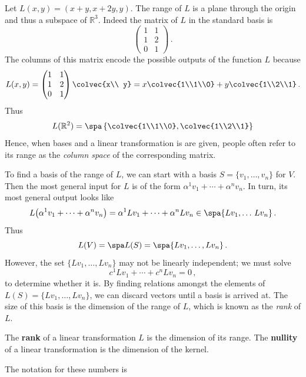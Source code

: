 \begin{example}
Let $L(x,y)=(x+y,x+2y,y)$. The range of $L$ is a plane through the origin and thus a subspace of ${\mathbb R}^3$.
Indeed the matrix of $L$ in the standard basis is 
\[
\begin{pmatrix}1&1\\1&2\\0&1\end{pmatrix}\, .
\]
The columns of this matrix encode the possible outputs of the function $L$ because
\[
L(x,y)=\begin{pmatrix}1&1\\1&2\\0&1\end{pmatrix}\colvec{x\\ y}=x \colvec{1\\1\\0}+y\colvec{1\\2\\1}\, . 
\]
Thus 
\[
L({\mathbb R}^2)=\spa \left\{\colvec{1\\1\\0},\colvec{1\\2\\1}\right\}
\]
Hence, when  bases and a linear transformation is are given, people often refer to its range as the {\itshape column space}
of the corresponding matrix.
\end{example}

To find a basis of the range of $L$, we can start with a basis $S=\{v_1, \ldots, v_n\} $ for $V$. Then
the most general input for $L$ is of the form  $\alpha^1 v_1 + \cdots + \alpha^n v_n$. In turn, its most general output looks like
\[
L\big(\alpha^1 v_1 + \cdots + \alpha^n v_n\big)=\alpha^1 Lv_1 + \cdots + \alpha^n Lv_n\in \spa\{Lv_1,\ldots\,Lv_n\}\, .
\]
Thus
\[
L(V)=\spa L(S) = \spa \{Lv_1, \ldots, Lv_n\}\, .
\]
However, the set $\{Lv_1, \ldots, Lv_n\}$ may not be linearly independent; we must solve 
\[
c^1Lv_1+ \cdots + c^nLv_n=0\, ,
\]
to determine whether it is.
By finding relations amongst the elements of $L(S)=\{Lv_1,\ldots ,L v_n\}$, we can discard vectors until a basis is arrived at.  The size of this basis is the dimension of the range of $L$, which is known as the \emph{rank} of $L$.


\begin{definition}
The {\bfseries rank} of a linear transformation $L$ is the dimension of its range.
The {\bfseries nullity} of a linear transformation is the dimension of the kernel.
\end{definition}
The notation for these numbers is 

